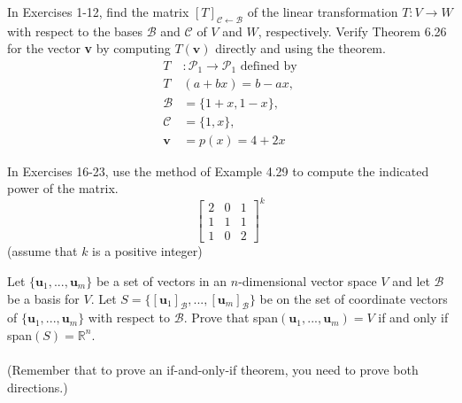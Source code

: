 \documentclass[12pt,letterpaper]{hmcpset}
\newcommand{\RR}{\mathbb{R}}
\newcommand{\m}[1]{\begin{bmatrix} #1 \end{bmatrix}}
\begin{document}
\begin{problem}[Poole 6.6.2]
    In Exercises 1-12, find the matrix
    $[T]_{\mathcal{C}\leftarrow\mathcal{B}}$ of the linear
    transformation $T:V\to W$ with respect to the bases $\mathcal{B}$
    and $\mathcal{C}$ of $V$ and $W$, respectively. Verify Theorem
    6.26 for the vector \textbf{v} by computing $T(\textbf{v})$
    directly and using the theorem.
    \begin{align*}
        T&:\mathscr{P}_1\to\mathscr{P}_1\text{ defined by}\\T&(a+bx)=b-ax,\\
        \mathcal{B}&=\{1+x,1-x\},\\\mathcal{C}&=\{1,x\},\\\textbf{v}&=p(x)=4+2x
    \end{align*}
\end{problem}
\begin{solution}
    \vfill
\end{solution}
\newpage

\begin{problem}[Poole 4.4.22]
    In Exercises 16-23, use the method of Example 4.29 to compute the
    indicated power of the matrix.
    \[
        \m{2&0&1\\1&1&1\\1&0&2}^k
    \]
    (assume that $k$ is a positive integer)
\end{problem}
\begin{solution}
    \vfill
\end{solution}
\newpage

\begin{problem}
    Let $\{\textbf{u}_1,...,\textbf{u}_m\}$ be a set of vectors in an
    $n$-dimensional vector space $V$ and let $\mathcal{B}$ be a basis
    for $V$. Let
    $S=\{[\textbf{u}_1]_{\mathcal{B}},...,[\textbf{u}_m]_{\mathcal{B}}\}$
    be on the set of coordinate vectors of
    $\{\textbf{u}_1,...,\textbf{u}_m\}$ with respect to
    $\mathcal{B}$. Prove that span$(\textbf{u}_1,...,\textbf{u}_m)=V$
    if and only if span$(S)=\RR^n$.\\\\
    (Remember that to prove an if-and-only-if theorem, you need to
    prove both directions.)
\end{problem}
\begin{solution}
    \vfill
\end{solution}
\end{document}
